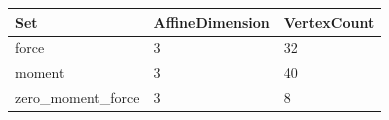 \begin{tabular}{@{}lll@{}}
\toprule
Set & AffineDimension & VertexCount \\
\midrule
force & 3 & 32 \\
moment & 3 & 40 \\
zero\_moment\_force & 3 & 8 \\
\bottomrule
\end{tabular}
